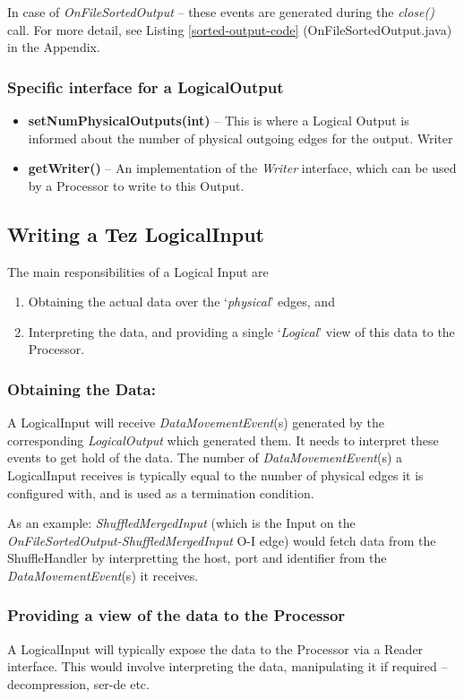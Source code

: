 \documentclass[twocolumn]{article}
\newcommand{\bi}{\begin{itemize}}
\newcommand{\ei}{\end{itemize}}
\newcommand{\be}{\begin{enumerate}}
\newcommand{\ee}{\end{enumerate}}
\newcommand{\ii}{\item}
\begin{document}
In case of \textit{OnFileSortedOutput} -- these events are generated during the
\textit{close()} call.
For more detail, see Listing \ref{sorted-output-code} (OnFileSortedOutput.java) in the Appendix.

\subsubsection*{Specific interface for a LogicalOutput}

\bi
\ii \textbf{setNumPhysicalOutputs(int)} -- This is where a Logical Output is informed
about the number of physical outgoing edges for the output. Writer
\ii \textbf{getWriter()} -- An implementation of the \textit{Writer} interface, which can be
used by a Processor to write to this Output.
\ei

\subsection{Writing a Tez LogicalInput}

The main responsibilities of a Logical Input are
\be
\ii Obtaining the actual data over the `\textit{physical}' edges, and 
\ii Interpreting the data, and providing a single `\textit{Logical}' view of this data to the Processor.
\ee

\subsubsection*{Obtaining the Data:}
A LogicalInput will receive \textit{DataMovementEvent}(s) generated by the
corresponding \textit{LogicalOutput} which generated them. It needs to interpret
these events to get hold of the data. The number of \textit{DataMovementEvent}(s)
a LogicalInput receives is typically equal to the number of physical
edges it is configured with, and is used as a termination condition.

As an example: \textit{ShuffledMergedInput} (which is the Input on the
\textit{OnFileSortedOutput-ShuffledMergedInput} O-I edge) would fetch data from
the ShuffleHandler by interpretting the host, port and identifier from
the \textit{DataMovementEvent}(s) it receives.

\subsubsection*{Providing a view of the data to the Processor} 
A LogicalInput will typically expose the data to the Processor via a
Reader interface. This would involve interpreting the data, manipulating
it if required -- decompression, ser-de etc.
\end{document}
